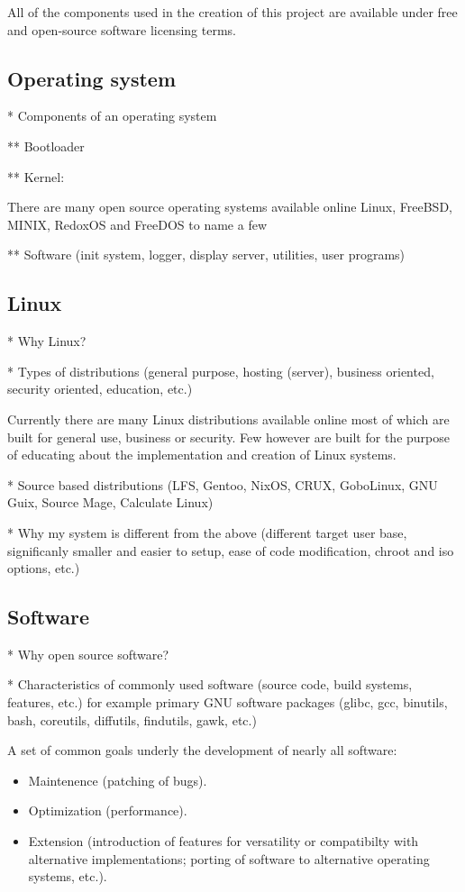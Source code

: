 All of the components used in the creation of this project are available under free and open-source software licensing terms.

\subsection{Operating system}

* Components of an operating system

** Bootloader

** Kernel:

There are many open source operating systems available online Linux, FreeBSD, MINIX, RedoxOS and FreeDOS to name a few 

** Software (init system, logger, display server, utilities, user programs)

\subsection{Linux}

* Why Linux?


* Types of distributions (general purpose, hosting (server), business oriented, security oriented, education, etc.)

Currently there are many Linux distributions available online most of which are built for general use, business or security. Few however are built for the purpose of educating about the implementation and creation of Linux systems. 

* Source based distributions (LFS, Gentoo, NixOS, CRUX, GoboLinux, GNU Guix, Source Mage, Calculate Linux)

* Why my system is different from the above (different target user base, significanly smaller and easier to setup, ease of code modification, chroot and iso options, etc.)


\subsection{Software}

* Why open source software?

* Characteristics of commonly used software (source code, build systems, features, etc.) for example primary GNU software packages (glibc, gcc, binutils, bash, coreutils, diffutils, findutils, gawk, etc.)

A set of common goals underly the development of nearly all software:

\begin{itemize}
    \item Maintenence (patching of bugs).
    \item Optimization (performance).
    \item Extension (introduction of features for versatility or compatibilty with alternative implementations; porting of software to alternative operating systems, etc.).
\end{itemize}

